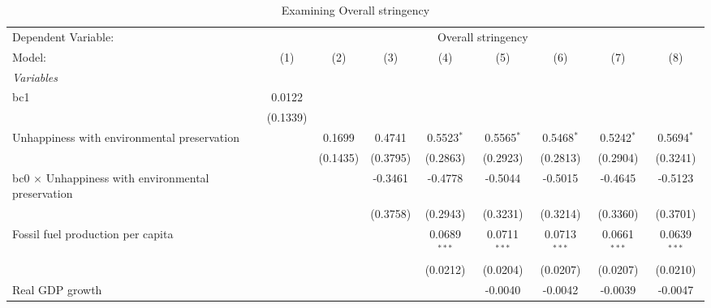 
\begin{table}[htbp]
   \caption{Examining Overall stringency}
   \centering
   \begin{tabular}{lcccccccc}
      \tabularnewline \midrule \midrule
      Dependent Variable: & \multicolumn{8}{c}{Overall stringency}\\
      Model:                                                    & (1)      & (2)      & (3)      & (4)            & (5)            & (6)            & (7)            & (8)\\  
      \midrule
      \emph{Variables}\\
      bc1                                                       & 0.0122   &          &          &                &                &                &                &   \\   
                                                                & (0.1339) &          &          &                &                &                &                &   \\   
      Unhappiness with environmental preservation               &          & 0.1699   & 0.4741   & 0.5523$^{*}$   & 0.5565$^{*}$   & 0.5468$^{*}$   & 0.5242$^{*}$   & 0.5694$^{*}$\\   
                                                                &          & (0.1435) & (0.3795) & (0.2863)       & (0.2923)       & (0.2813)       & (0.2904)       & (0.3241)\\   
      bc0 $\times$ Unhappiness with environmental preservation  &          &          & -0.3461  & -0.4778        & -0.5044        & -0.5015        & -0.4645        & -0.5123\\   
                                                                &          &          & (0.3758) & (0.2943)       & (0.3231)       & (0.3214)       & (0.3360)       & (0.3701)\\   
      Fossil fuel production per capita                         &          &          &          & 0.0689$^{***}$ & 0.0711$^{***}$ & 0.0713$^{***}$ & 0.0661$^{***}$ & 0.0639$^{***}$\\   
                                                                &          &          &          & (0.0212)       & (0.0204)       & (0.0207)       & (0.0207)       & (0.0210)\\   
      Real GDP growth                                           &          &          &          &                & -0.0040        & -0.0042        & -0.0039        & -0.0047\\   

\end{tabular}
\end{table}
